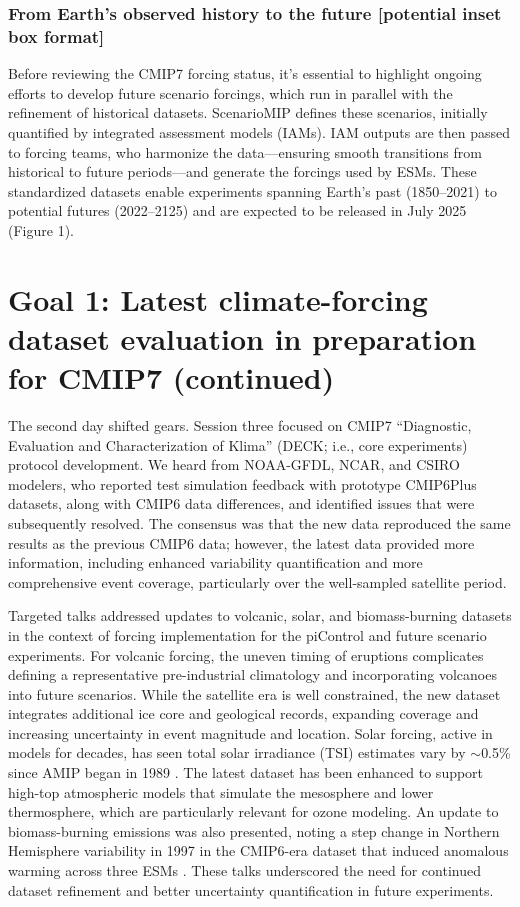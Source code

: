 \documentclass{ametsocV6.1}
\begin{document}
\subsubsection*{From Earth’s observed history to the future [potential inset box format]}
Before reviewing the CMIP7 forcing status, it's essential to highlight ongoing efforts to develop future scenario forcings, which run in parallel with the refinement of historical datasets. ScenarioMIP \citep{van_vuuren_scenario_2025} defines these scenarios, initially quantified by integrated assessment models (IAMs). IAM outputs are then passed to forcing teams, who harmonize the data—ensuring smooth transitions from historical to future periods—and generate the forcings used by ESMs. These standardized datasets enable experiments spanning Earth’s past (1850–2021) to potential futures (2022–2125) and are expected to be released in July 2025 (Figure 1).

\section*{Goal 1: Latest climate-forcing dataset evaluation in preparation for CMIP7 (continued)}
The second day shifted gears. Session three focused on CMIP7 ``Diagnostic, Evaluation and Characterization of Klima'' (DECK; i.e., core experiments) protocol development. We heard from NOAA-GFDL, NCAR, and CSIRO modelers, who reported test simulation feedback with prototype CMIP6Plus datasets, along with CMIP6 data differences, and identified issues that were subsequently resolved. The consensus was that the new data reproduced the same results as the previous CMIP6 data; however, the latest data provided more information, including enhanced variability quantification and more comprehensive event coverage, particularly over the well-sampled satellite period.

Targeted talks addressed updates to volcanic, solar, and biomass-burning datasets in the context of forcing implementation for the piControl and future scenario experiments. For volcanic forcing, the uneven timing of eruptions complicates defining a representative pre-industrial climatology and incorporating volcanoes into future scenarios. While the satellite era is well constrained, the new dataset integrates additional ice core and geological records, expanding coverage and increasing uncertainty in event magnitude and location. Solar forcing, active in models for decades, has seen total solar irradiance (TSI) estimates vary by $\sim$0.5\% since AMIP began in 1989 \citep{durack_coupled_2025}. The latest dataset has been enhanced to support high-top atmospheric models that simulate the mesosphere and lower thermosphere, which are particularly relevant for ozone modeling. An update to biomass-burning emissions was also presented, noting a step change in Northern Hemisphere variability in 1997 in the CMIP6-era dataset that induced anomalous warming across three ESMs \cite[e.g.,][]{fasullo_overview_2024,holland_new_2024}. These talks underscored the need for continued dataset refinement and better uncertainty quantification in future experiments.
\end{document}
